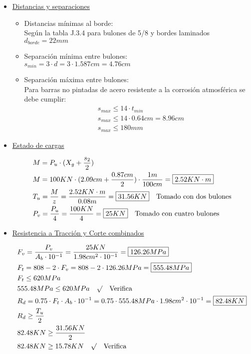 \begin{enumerate}
\begin{itemize}
\item \underline{Distancias y separaciones}
	\begin{itemize}
	\item Distancias mínimas al borde:\\
	Según la tabla J.3.4 para bulones de 5/8 y bordes laminados $d_{borde} = 22 mm$
	\item Separación mínima entre bulones:\\
	$s_{min} = 3 \cdot d = 3 \cdot 1.587cm = 4.76cm$
	\item Separación máxima entre bulones:\\
	Para barras no pintadas de acero resistente a la corrosión atmosférica se debe cumplir:
	\begin{align*}
	& s_{max} \leq 14 \cdot t_{min}\\
	& s_{max} \leq 14 \cdot 0.64cm = 8.96cm\\
	& s_{max} \leq 180mm
	\end{align*}
	\end{itemize}

\item \underline{Estado de cargas}

\begin{align*}
& M = P_u \cdot (X_g + \frac{s_2}{2}) \\
& M = 100KN \cdot (2.09cm + \frac{0.87cm}{2}) \cdot \frac{1m}{100cm} = \framebox{$2.52KN \cdot m$} \\
& T_u = \frac{M}{z} = \frac{2.52KN \cdot m}{0.08m} = \framebox{$31.56 KN$} \quad \text{Tomado con dos bulones}\\
& P_v = \frac{P_u}{4} = \frac{100KN}{4} = \framebox{$25 KN$} \quad \text{Tomado con cuatro bulones}
\end{align*}
\newpage
\item \underline{Resistencia a Tracción y Corte combinados}

\begin{align*}
& F_v = \frac{P_v}{A_b \cdot 10^{-1}} = \frac{25 KN}{1.98 cm^2 \cdot 10^{-1}} = \framebox{$126.26 MPa$}\\
& F_t = 808 - 2 \cdot F_v = 808 - 2 \cdot 126.26 MPa = \framebox{$555.48 MPa$} \\
& F_t \leq 620 MPa \\
& 555.48 MPa \leq 620 MPa \quad \surd \quad \text{Verifica} \\
& R_d = 0.75 \cdot F_t \cdot A_b \cdot 10^{-1} = 0.75 \cdot 555.48 MPa \cdot 1.98 cm^2 \cdot 10^{-1} = \framebox{$82.48 KN$}\\
& R_d \geq \frac{T_u}{2}\\
& 82.48 KN \geq \frac{31.56 KN}{2}\\
& 82.48 KN \geq 15.78 KN \quad \surd \quad \text{Verifica} \\
\end{align*}


\end{itemize}
\end{enumerate}
